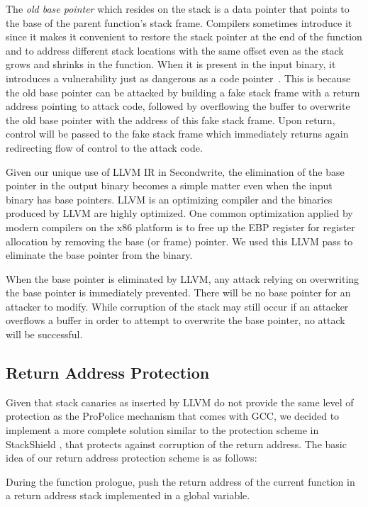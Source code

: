 The \emph{old base pointer} which resides on the stack is a data
pointer that points to the base of the parent function's
stack frame. Compilers sometimes introduce it since it makes it
convenient to restore the stack pointer at the end of the function and
to address different stack locations with the same offset even as the
stack grows and shrinks in the function. When it is present in the
input binary, it introduces a vulnerability just as dangerous as a
code pointer~\cite{wilander2003}. This is because the old base pointer
can be attacked by building a fake stack frame with a return address
pointing to attack code, followed by overflowing the buffer to
overwrite the old base pointer with the address of this fake stack
frame. Upon return, control will be passed to the fake stack frame
which immediately returns again redirecting flow of control to the
attack code.

Given our unique use of LLVM IR in Secondwrite, the elimination of the
base pointer in the output binary becomes a simple matter even when
the input binary has base pointers. LLVM is an optimizing compiler and
the binaries produced by LLVM are highly optimized. One common
optimization applied by modern compilers on the x86 platform is to
free up the EBP register for register allocation by removing the base
(or frame) pointer. We used this LLVM pass to eliminate the base
pointer from the binary.

When the base pointer is eliminated by LLVM, any attack relying on overwriting the base pointer
is immediately prevented. There will be no base pointer for an
attacker to modify. While corruption of the stack may still occur if
an attacker overflows a buffer in order to attempt to overwrite the
base pointer, no attack will be successful.

\subsection{Return Address Protection}

Given that stack canaries as inserted by LLVM do not provide the same
level of protection as the ProPolice mechanism that comes with GCC, we
decided to implement a more complete solution similar to the
protection scheme in StackShield \cite{stackshield}, that protects
against corruption of the return address. The basic idea of our return
address protection scheme is as follows:

\mybeginenumerate

 \item During the function prologue, push the return address of the
   current function in a return address stack implemented in a global
   variable.

